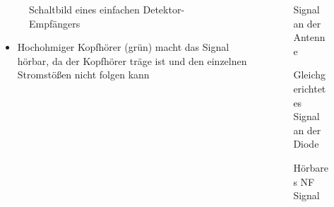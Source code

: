 \begin{frame}
\begin{columns}
    \begin{column}{0.48\textwidth}
    
\begin{figure}
    \caption{\scriptsize Schaltbild eines einfachen Detektor-Empfängers}
    \label{am_detektor}
\end{figure}

\begin{itemize}
  \item Hochohmiger Kopfhörer (grün) macht das Signal hörbar, da der Kopfhörer träge ist und den einzelnen Stromstößen nicht folgen kann
  \end{itemize}

    \end{column}
   \begin{column}{0.48\textwidth}
       
\begin{figure}
    \caption{\scriptsize Signal an der Antenne}
    \label{am_detektor_antenne}
\end{figure}


\begin{figure}
    \caption{\scriptsize Gleichgerichtetes Signal an der Diode}
    \label{am_detektor_diode}
\end{figure}


\begin{figure}
    \caption{\scriptsize Hörbares NF Signal}
    \label{am_detektor_kopfhoerer}
\end{figure}


   \end{column}
\end{columns}

\end{frame}

\begin{frame}
\end{frame}%
